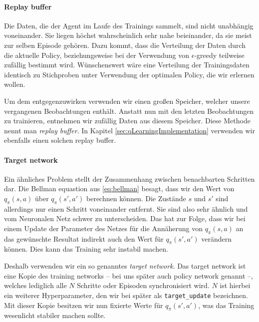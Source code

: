 \paragraph{Replay buffer}
Die Daten, die der Agent im Laufe des Trainings sammelt, sind nicht unabhängig voneinander. Sie liegen höchst wahrscheinlich sehr nahe beieinander, da sie meist zur selben Episode gehören. Dazu kommt, dass die Verteilung der Daten durch die aktuelle Policy, beziehungsweise bei der Verwendung von $ \epsilon $-greedy teilweise zufällig bestimmt wird. Wünschenswert wäre eine Verteilung der Trainingsdaten identisch zu Stichproben unter Verwendung der optimalen Policy, die wir erlernen wollen.

Um dem entgegenzuwirken verwenden wir einen großen Speicher, welcher unsere vergangenen Beobachtungen enthält. Anstatt nun mit den letzten Beobachtungen zu trainieren, entnehmen wir zufällig Daten aus diesem Speicher. Diese Methode nennt man \textit{replay buffer}. In Kapitel \ref{sec:qLearningImplementation} verwenden wir ebenfalls einen solchen replay buffer.

\paragraph{Target network}
Ein ähnliches Problem stellt der Zusammenhang zwischen benachbarten Schritten dar. Die Bellman equastion aus \ref{eq:bellman} besagt, dass wir den Wert von $ q_\pi(s, a) $ über $ q_\pi(s', a') $ berechnen können. Die Zustände $ s $ und $ s' $ sind allerdings nur einen Schritt voneinander entfernt. Sie sind also sehr ähnlich und vom Neuronalen Netz schwer zu unterscheiden. Das hat zur Folge, dass wir bei einem Update der Parameter des Netzes für die Annäherung von $ q_\pi(s, a) $ an das gewünschte Resultat indirekt auch den Wert für $ q_\pi(s', a') $ verändern können. Dies kann das Training sehr instabil machen.

Deshalb verwenden wir ein so genanntes \textit{target network}. Das target network ist eine Kopie des training networks -- bei uns später auch policy network genannt --, welches lediglich alle $ N $ Schritte oder Episoden synchronisiert wird. $ N $ ist hierbei ein weiterer Hyperparameter, den wir bei später als \texttt{target_update} bezeichnen. Mit dieser Kopie besitzen wir nun fixierte Werte für $ q_\pi(s', a') $, was das Training wesenlicht stabiler machen sollte.

